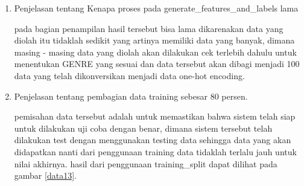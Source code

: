 \begin{enumerate}


\subitem pada code ini dimulai dengan membuat 3 data Variable array dengan format 2 nilai kosong dan 1 memiliki nilai. dimana data tersebut akan diolah dengan perintah FOR untuk membagi datasetnya sesuai dengan data GENRE yang telah ada. dengan menggunakan NUMPY pada perintah selanjutnya untuk melakukan pembagian data dan dikonversikan menjadi data one-hot encoding.

\subitem hasil dari penggunaan perintah generate\_features\_and\_labels dapat dilihat pada gambar \ref{data12}

\begin{figure}[!htbp]
      \caption{Code Program generate\_features\_and\_labels}
      \label{data12}
\end{figure}

\item Penjelasan tentang Kenapa proses pada generate\_features\_and\_labels lama



\subitem pada bagian penampilan hasil tersebut bisa lama dikarenakan data yang diolah itu tidaklah sedikit yang artinya memiliki data yang banyak, dimana masing - masing data yang diolah akan dilakukan cek terlebih dahulu untuk menentukan GENRE yang sesuai dan data tersebut akan dibagi menjadi 100 data yang telah dikonversikan menjadi data one-hot encoding.

\item Penjelasan tentang pembagian data training sebesar 80 persen.



\subitem pemisahan data tersebut adalah untuk memastikan bahwa sistem telah siap untuk dilakukan uji coba dengan benar, dimana sistem tersebut telah dilakukan test dengan menggunakan testing data sehingga data yang akan didapatkan nanti dari penggunaan training data tidaklah terlalu jauh untuk nilai akhirnya. hasil dari penggunaan training\_split dapat dilihat pada gambar \ref{data13}.


\end{enumerate}
